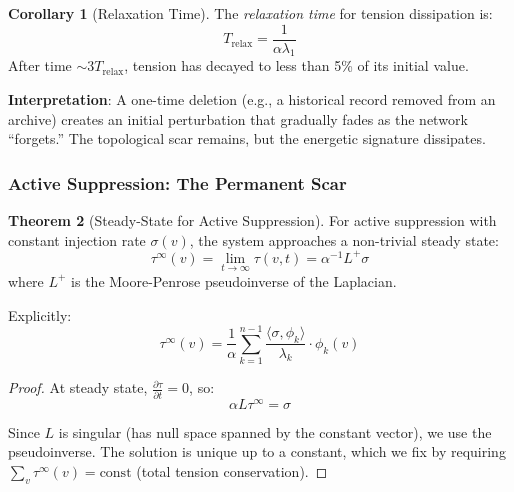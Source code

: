 \documentclass[12pt,a4paper]{article}
\theoremstyle{definition}
\newtheorem{theorem}{Theorem}[section]
\newtheorem{corollary}[theorem]{Corollary}
\theoremstyle{remark}
\begin{document}
\begin{corollary}[Relaxation Time]
The \emph{relaxation time} for tension dissipation is:
\begin{equation}
    T_{\text{relax}} = \frac{1}{\alpha \lambda_1}
\end{equation}
After time $\sim 3T_{\text{relax}}$, tension has decayed to less than 5\% of its initial value.
\end{corollary}

\textbf{Interpretation}: A one-time deletion (e.g., a historical record removed from an archive) creates an initial perturbation that gradually fades as the network ``forgets.'' The topological scar remains, but the energetic signature dissipates.

\subsubsection{Active Suppression: The Permanent Scar}

\begin{theorem}[Steady-State for Active Suppression]
\label{thm:active-steady}
For active suppression with constant injection rate $\sigma(v)$, the system approaches a non-trivial steady state:
\begin{equation}
    \boxed{
    \tau^{\infty}(v) = \lim_{t \to \infty} \tau(v, t) = \alpha^{-1} L^+ \sigma
    }
\end{equation}
where $L^+$ is the Moore-Penrose pseudoinverse of the Laplacian.

Explicitly:
\begin{equation}
    \tau^{\infty}(v) = \frac{1}{\alpha} \sum_{k=1}^{n-1} \frac{\langle \sigma, \phi_k \rangle}{\lambda_k} \cdot \phi_k(v)
\end{equation}
\end{theorem}

\begin{proof}
At steady state, $\frac{\partial \tau}{\partial t} = 0$, so:
\begin{equation}
    \alpha L \tau^{\infty} = \sigma
\end{equation}

Since $L$ is singular (has null space spanned by the constant vector), we use the pseudoinverse. The solution is unique up to a constant, which we fix by requiring $\sum_v \tau^{\infty}(v) = \text{const}$ (total tension conservation).
\end{proof}
\end{document}
